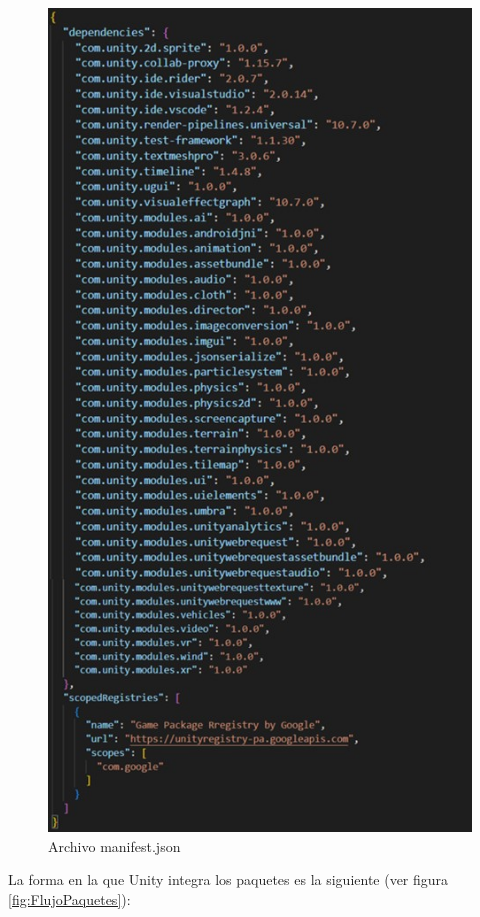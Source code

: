 \begin{figure}[h]
    \centering
    \includegraphics[scale=0.45]{img/Manifestjson.jpg}
    \caption{Archivo manifest.json}
    \label{fig:ManifestJSON}
    \end{figure}
    
La forma en la que Unity integra los paquetes es la siguiente (ver figura \ref{fig:FlujoPaquetes}):


